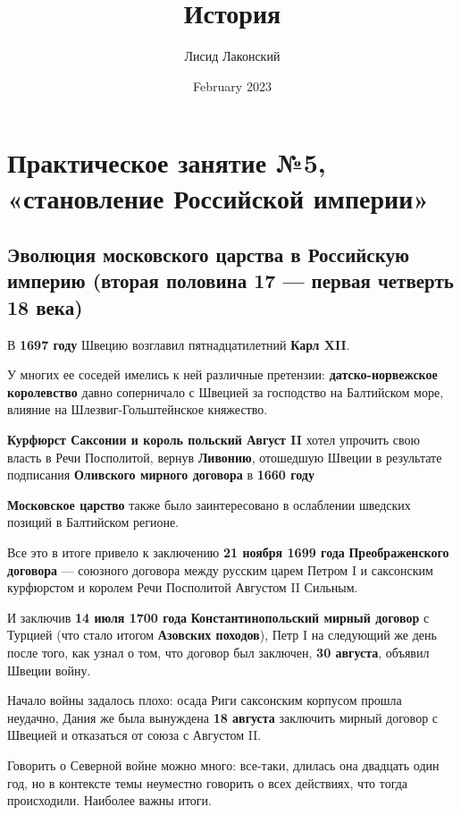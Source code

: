 \documentclass{article}
\title{История}
\author{Лисид Лаконский}
\date{February 2023}
\begin{document}
\raggedright

\maketitle
\tableofcontents
\pagebreak

\section{Практическое занятие №5, «становление Российской империи»}

\subsection{Эволюция московского царства в Российскую империю (вторая половина 17 — первая четверть 18 века)}

В \textbf{1697 году} Швецию возглавил пятнадцатилетний \textbf{Карл XII}.

У многих ее соседей имелись к ней различные претензии: \textbf{датско-норвежское королевство} давно соперничало с Швецией за господство на Балтийском море, влияние на Шлезвиг-Гольштейнское княжество.

\textbf{Курфюрст Саксонии и король польский Август II} хотел упрочить свою власть в Речи Посполитой, вернув \textbf{Ливонию}, отошедшую Швеции в результате подписания \textbf{Оливского мирного договора} в \textbf{1660 году}

\textbf{Московское царство} также было заинтересовано в ослаблении шведских позиций в Балтийском регионе.

\hfill

Все это в итоге привело к заключению \textbf{21 ноября 1699 года} \textbf{Преображенского договора} — союзного договора между русским царем Петром I и саксонским курфюрстом и королем Речи Посполитой Августом II Сильным.

И заключив \textbf{14 июля 1700 года} \textbf{Константинопольский мирный договор} с Турцией (что стало итогом \textbf{Азовских походов}), Петр I на следующий же день после того, как узнал о том, что договор был заключен, \textbf{30 августа}, объявил Швеции войну.

\hfill

Начало войны задалось плохо: осада Риги саксонским корпусом прошла неудачно, Дания же была вынуждена \textbf{18 августа} заключить мирный договор с Швецией и отказаться от союза с Августом II.

Говорить о Северной войне можно много: все-таки, длилась она двадцать один год, но в контексте темы неуместно говорить о всех действиях, что тогда происходили. Наиболее важны итоги.
\end{document}
